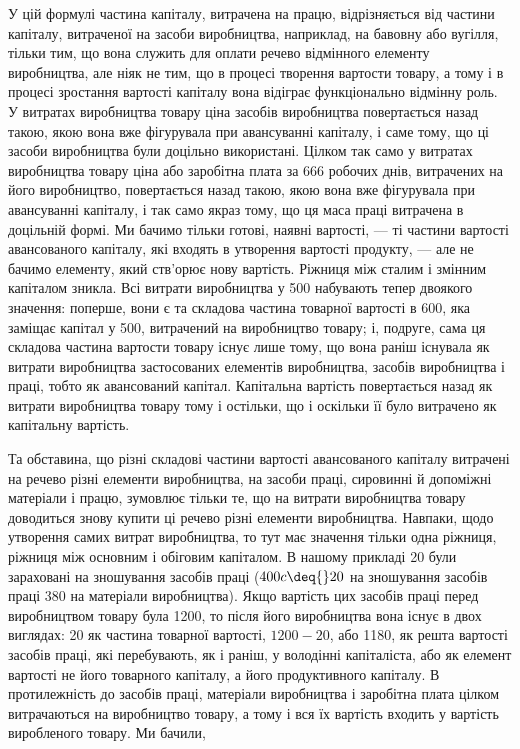 
У цій формулі частина капіталу, витрачена на працю, відрізняється
від частини капіталу, витраченої на засоби виробництва,
наприклад, на бавовну або вугілля, тільки тим, що вона
служить для оплати речево відмінного елементу виробництва,
але ніяк не тим, що в процесі творення вартости товару, а тому
і в процесі зростання вартості капіталу вона відіграє функціонально
відмінну роль. У витратах виробництва товару ціна засобів
виробництва повертається назад такою, якою вона вже
фігурувала при авансуванні капіталу, і саме тому, що ці засоби
виробництва були доцільно використані. Цілком так само у витратах
виробництва товару ціна або заробітна плата за 666
робочих днів, витрачених на його виробництво, повертається
назад такою, якою вона вже фігурувала при авансуванні капіталу,
і так само якраз тому, що ця маса праці витрачена в доцільній
формі. Ми бачимо тільки готові, наявні вартості, — ті
частини вартості авансованого капіталу, які входять в утворення
вартості продукту, — але не бачимо елементу, який ств'орює
нову вартість. Ріжниця між сталим і змінним капіталом зникла.
Всі витрати виробництва у 500 набувають
тепер двоякого значення: поперше, вони є та складова частина
товарної вартості в 600, яка заміщає капітал
у 500, витрачений на виробництво товару;
і, подруге, сама ця складова частина вартости товару існує лише
тому, що вона раніш існувала як витрати виробництва застосованих
елементів виробництва, засобів виробництва і праці, тобто
як авансований капітал. Капітальна вартість повертається назад
як витрати виробництва товару тому і остільки, що і оскільки
її було витрачено як капітальну вартість.

Та обставина, що різні складові частини вартості авансованого
капіталу витрачені на речево різні елементи виробництва,
на засоби праці, сировинні й допоміжні матеріали і працю,
зумовлює тільки те, що на витрати виробництва товару доводиться
знову купити ці речево різні елементи виробництва.
Навпаки, щодо утворення самих витрат виробництва, то тут має
значення тільки одна ріжниця, ріжниця між основним і обіговим
капіталом. В нашому прикладі 20 були зараховані
на зношування засобів праці ($400 c \deq{} 20$
на зношування засобів праці \dplus{} 380 на
матеріали виробництва). Якщо вартість цих засобів праці перед
виробництвом товару була \deq{} 1200, то після
його виробництва вона існує в двох виглядах: 20
як частина товарної вартості, $1200-20$, або 1180,
як решта вартості засобів праці, які перебувають, як і раніш,
у володінні капіталіста, або як елемент вартості не його
товарного капіталу, а його продуктивного капіталу. В протилежність
до засобів праці, матеріали виробництва і заробітна плата
цілком витрачаються на виробництво товару, а тому і вся їх
вартість входить у вартість виробленого товару. Ми бачили,
\parbreak{}  %

